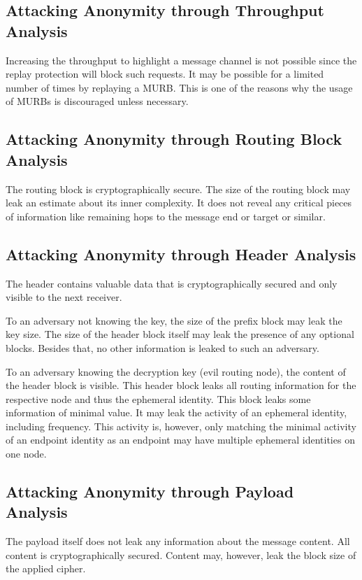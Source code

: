 \subsection{Attacking Anonymity through Throughput Analysis}
Increasing the throughput to highlight a message channel is not possible since the replay protection will block such requests. It may be possible for a limited number of times by replaying a MURB. This is one of the reasons why the usage of MURBs is discouraged unless necessary.

\subsection{Attacking Anonymity through Routing Block Analysis}
The routing block is cryptographically secure. The size of the routing block may leak an estimate about its inner complexity. It does not reveal any critical pieces of information like remaining hops to the message end or target or similar.

\subsection{Attacking Anonymity through Header Analysis}
The header contains valuable data that is cryptographically secured and only visible to the next receiver. 

To an adversary not knowing the key, the size of the prefix block may leak the key size. The size of the header block itself may leak the presence of any optional blocks. Besides that, no other information is leaked to such an adversary.

To an adversary knowing the decryption key (evil routing node), the content of the header block is visible. This header block leaks all routing information for the respective node and thus the ephemeral identity. This block leaks some information of minimal value. It may leak the activity of an ephemeral identity, including frequency. This activity is, however, only matching the minimal activity of an endpoint identity as an endpoint may have multiple ephemeral identities on one node. 

\subsection{Attacking Anonymity through Payload Analysis}
The payload itself does not leak any information about the message content. All content is cryptographically secured. Content may, however, leak the block size of the applied cipher.

